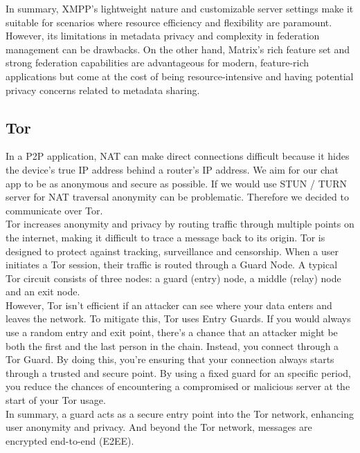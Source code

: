 In summary, XMPP's lightweight nature and customizable server settings make it suitable for scenarios where resource efficiency and flexibility are paramount. However, its limitations in metadata privacy and complexity in federation management can be drawbacks. On the other hand, Matrix’s rich feature set and strong federation capabilities are advantageous for modern, feature-rich applications but come at the cost of being resource-intensive and having potential privacy concerns related to metadata sharing.

\subsection{Tor}
In a P2P application, NAT can make direct connections difficult because it hides the device's true IP address behind a router's IP address.
We aim for our chat app to be as anonymous and secure as possible. If we would use STUN / TURN server for NAT traversal anonymity can be problematic.
Therefore we decided to communicate over Tor.\\

Tor increases anonymity and privacy by routing traffic through multiple points on the internet, making it difficult to trace a message back to its origin.
Tor is designed to protect against tracking, surveillance and censorship. When a user initiates a Tor session, their traffic is routed through a Guard Node. A typical Tor circuit consists of three nodes: a guard (entry) node, a middle (relay) node and an exit node. \\

However, Tor isn't efficient if an attacker can see where your data enters and leaves the network. To mitigate this, Tor uses Entry Guards. If you would always use a random entry and exit point,
there's a chance that an attacker might be both the first and the last person in the chain. Instead, you connect through a Tor Guard. By doing this, you're ensuring that your connection always starts through a trusted and secure point.
By using a fixed guard for an specific period, you reduce the chances of encountering a compromised or malicious server at the start of your Tor usage. \cite{torproject2023entryguards} \\

In summary, a guard acts as a secure entry point into the Tor network, enhancing user anonymity and privacy. And beyond the Tor network, messages are encrypted end-to-end (E2EE).



